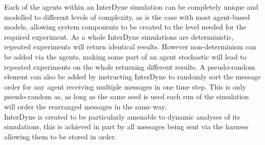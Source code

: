 \documentclass{article}
\begin{document}
Each of the agents within an InterDyne simulation can be completely unique and modelled to different levels of complexity, as is the case with most agent-based models, allowing system components to be created to the level needed for the required experiment. As a whole InterDyne simulations are deterministic, repeated experiments will return identical results. However non-determinism can be added via the agents, making some part of an agent stochastic will lead to repeated experiments on the whole returning different results. A pseudo-random element can also be added by instructing InterDyne to randomly sort the message order for any agent receiving multiple messages in one time step. This is only pseudo-random as, as long as the same seed is used each run of the simulation will order the rearranged messages in the same way.\\
InterDyne is created to be particularly amenable to dynamic analyses of its simulations, this is achieved in part by all messages being sent via the harness allowing them to be stored in order.     
\end{document}
